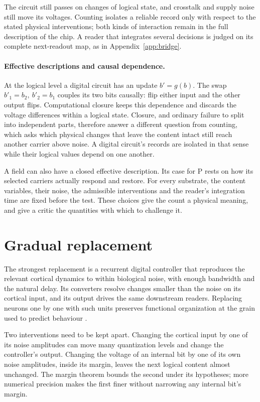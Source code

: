 \documentclass[12pt]{article}
\begin{document}
The circuit still passes on changes of logical state, and crosstalk and supply
noise still move its voltages. Counting isolates a reliable record only with
respect to the stated physical interventions; both kinds of interaction remain
in the full description of the chip. A reader that integrates several
decisions is judged on its complete next-readout map, as in
Appendix~\ref{app:bridge}.

\paragraph{Effective descriptions and causal dependence.} At the logical
level a digital circuit has an update $b'=g(b)$. The swap
$b'_1=b_2,\ b'_2=b_1$ couples its two bits causally: flip either input and the
other output flips. Computational closure keeps this dependence and discards
the voltage differences within a logical state. Closure, and ordinary failure
to split into independent parts, therefore answer a different question from
counting, which asks which physical changes that leave the content intact still
reach another carrier above noise. A digital circuit's records are isolated in
that sense while their logical values depend on one another.

A field can also have a closed effective description. Its case for P rests on
how its selected carriers actually respond and restore. For every substrate,
the content variables, their noise, the admissible interventions and the
reader's integration time are fixed before the test. These choices give the
count a physical meaning, and give a critic the quantities with which to
challenge it.

\section{Gradual replacement}
\label{app:replacement}

The strongest replacement is a recurrent digital controller that reproduces
the relevant cortical dynamics to within biological noise, with enough
bandwidth and the natural delay. Its converters resolve changes smaller than
the noise on its cortical input, and its output drives the same downstream
readers. Replacing neurons one by one with such units preserves functional
organization at the grain used to predict behaviour \citep{chalmers1995}.

Two interventions need to be kept apart. Changing the cortical input by one of
its noise amplitudes can move many quantization levels and change the
controller's output. Changing the voltage of an internal bit by one of its own
noise amplitudes, inside its margin, leaves the next logical content almost
unchanged. The margin theorem bounds the second under its hypotheses; more
numerical precision makes the first finer without narrowing any internal bit's
margin.
\end{document}
